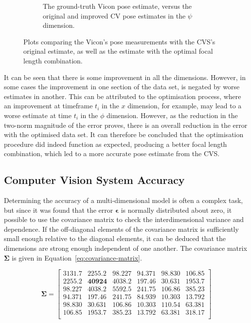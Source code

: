 \begin{figure}
\begin{subfigure}{0.45\textwidth}
    \caption{The ground-truth Vicon pose estimate, versus the original and improved CV pose estimates in the $\psi$ dimension.}
  \label{fig:estimate-yaw}
  \end{subfigure}
  \caption[Plots comparing the Vicon's measurements with the CVS's original and improved measurements. ]{Plots comparing the Vicon's pose measurements with the CVS's original estimate, as well as the estimate with the optimal focal length combination.}
  \label{fig:estimate}
\end{figure}

It can be seen that there is some improvement in all the dimensions. However, in some cases the improvement in one section of the data set, is negated by worse estimates in another. This can be attributed to the optimisation process, where an improvement at timeframe $t_i$ in the $x$ dimension, for example, may lead to a worse estimate at time $t_i$ in the $\phi$ dimension. However, as the reduction in the two-norm magnitude of the error proves, there is an overall reduction in the error with the optimised data set. It can therefore be concluded that the optimisation procedure did indeed function as expected, producing a better focal length combination, which led to a more accurate pose estimate from the CVS. 

\subsection{Computer Vision System Accuracy}

Determining the accuracy of a multi-dimensional model is often a complex task, but since it was found that the error $\bm{\epsilon}$ is normally distributed about zero, it possible to use the covariance matrix to check the interdimensional variance and dependence. If the off-diagonal elements of the covariance matrix is sufficiently small enough relative to the diagonal elements, it can be deduced that the dimensions are strong enough independent of one another. The covariance matrix $\bm{\Sigma}$ is given in Equation~\ref{eq:covariance-matrix}. 

\begin{equation}
  \label{eq:covariance-matrix}
  \bm{\Sigma} = 
  \begin{bmatrix}
    \bm{3131.7} & 2255.2 & 98.227 & 94.371 &  98.830 & 106.85 \\ 
    2255.2 & \bm{40924}  & 4038.2 & 197.46 &  30.631 & 1953.7 \\
    98.227 & 4038.2 & \bm{5592.5} & 241.75 &  106.86 & 385.23 \\
    94.371 & 197.46 & 241.75 & \bm{84.939} &  10.303 & 13.792 \\
    98.830 & 30.631 & 106.86 & 10.303 &  \bm{110.54} & 63.381 \\
    106.85 & 1953.7 & 385.23 & 13.792 &  63.381 & \bm{318.17} \\
  \end{bmatrix}
\end{equation}

